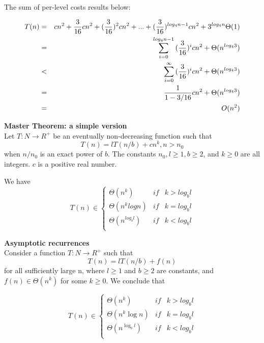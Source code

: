 \documentclass{seminar}
\begin{document}
\begin{slide}
The sum of per-level costs results below:

\begin{eqnarray*}
T(n) &=& cn^2 + {3 \over 16}cn^2 + ({3 \over 16})^2cn^2+...+  ({3 \over
  16})^{log_{4}n-1}cn^2 + 3^{log_{4}{n}}\Theta(1) \\
     &=& \sum_{i=0}^{log_{4}n-1}{(\frac{3}{16})^i}cn^2 +
\Theta(n^{log_{4}{3}}) \\
      &<& \sum_{i=0}^{\infty}{(\frac{3}{16})^i}cn^2 +
\Theta(n^{log_{4}{3}}) \\
     &=& \frac{1}{1-3/16}cn^2+\Theta(n^{log_{4}{3}})\\
     &=& O(n^2) 
\end{eqnarray*}
\end{slide}


\begin{slide}
{\bf Master Theorem: a simple version} \\
Let $T: N \rightarrow R^+$ be an eventually non-decreasing function such that
$$ T(n) = lT(n/b)+cn^k, n>n_0$$ when $n/n_0$ is an exact power of $b$.
The constants $n_0, l \ge 1, b \ge 2$, and $k \ge 0$ are all integers. $c$ is a
positive real number.

We have 
\[
T(n) \in \left\{
  \begin{array}{lll}
  \Theta(n^k) &if&  k > log_bl \\
  \Theta(n^k logn) &if& k = log_bl \\
  \Theta(n^{log_{b}{l}}) &if&  k < log_bl \\
  \end{array}
  \right.
\]
\end{slide}

\begin{slide}
{\bf Asymptotic recurrences} \\
Consider a function $T: N \rightarrow R^+$ such that
$$T(n) = lT(n/b) + f(n)$$
for all sufficiently large n, where $l \ge 1$ and $b \ge 2$ are constants, and 
$f(n) \in \Theta(n^k)$ for some $k \ge 0$. We conclude that 

\[
T(n) \in \left\{
 \begin{array}{lll}
       \Theta(n^k)& if & k > log_bl \\
       \Theta(n^k\log{n})& if & k = log_bl \\
       \Theta(n^{\log_{b}{l}}) & if & k < log_bl \\
 \end{array}
 \right.
\] 
 
\end{slide}
\end{document}
